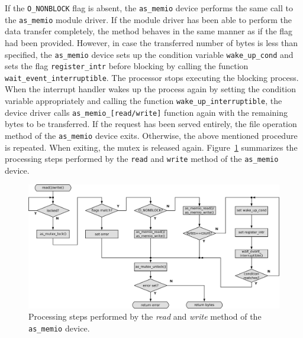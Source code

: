 If the \texttt{O\_NONBLOCK} flag is absent, the \texttt{as\_memio} device performs the same call to the \texttt{as\_memio} module driver.
If the module driver has been able to perform the data transfer completely, the method behaves in the same manner as if the flag had been provided.
However, in case the transferred number of bytes is less than specified, the \texttt{as\_memio} device sets up the condition variable \texttt{wake\_up\_cond} and sets the flag \texttt{register\_intr} before blocking by calling the function \texttt{wait\_event\_interruptible}.
The processor stops executing the blocking process.
When the interrupt handler wakes up the process again by setting the condition variable appropriately and calling the function \texttt{wake\_up\_interruptible}, the device driver calls \texttt{as\_memio\_[read/write]} function again with the remaining bytes to be transferred.
If the request has been served entirely, the file operation method of the \texttt{as\_memio} device exits.
Otherwise, the above mentioned procedure is repeated.
When exiting, the mutex is released again.
Figure~\ref{fig:memio-transfer} summarizes the processing steps performed by the \texttt{read} and \texttt{write} method of the \texttt{as\_memio} device.

\begin{figure}[ht]
    \centering
    \includegraphics[width=\textwidth,height=\textheight,keepaspectratio]{figs/memio_transfer.png}
    \caption{Processing steps performed by the \textit{read} and \textit{write} method of the \texttt{as\_memio} device.}
    \label{fig:memio-transfer}
\end{figure}

